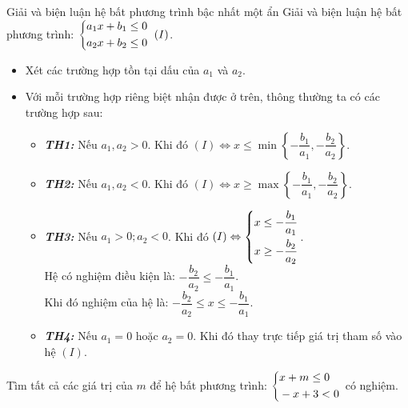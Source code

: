 \begin{dang}{Giải và biện luận hệ bất phương trình bậc nhất một ẩn}
Giải và biện luận hệ bất phương trình: $\heva{&a_1x+b_1\le 0\\&a_2x+b_2\le 0}\ (I)$. 
\begin{itemize}
\item Xét các trường hợp tồn tại dấu của $a_1$ và $a_2$.
\item Với mỗi trường hợp riêng biệt nhận được ở trên, thông thường ta có các trường hợp sau:
\begin{itemize}
\item\textbf{\textit{TH1: }}Nếu $a_1,a_2>0$. Khi đó $(I)\Leftrightarrow x\le \min\left\{-\dfrac{b_1}{a_1},-\dfrac{b_2}{a_2}\right\}$.
\item\textbf{\textit{TH2: }}Nếu $a_1,a_2<0$. Khi đó $(I)\Leftrightarrow x\ge \max\left\{-\dfrac{b_1}{a_1},-\dfrac{b_2}{a_2}\right\}$.
\item\textbf{\textit{TH3: }}Nếu $a_1>0;a_2<0$. Khi đó $(I)\Leftrightarrow \left\{\begin{aligned}&x\le -\dfrac{b_1}{a_1}\\&x\ge -\dfrac{b_2}{a_2}\end{aligned}\right.$.\\
Hệ có nghiệm điều kiện là: $-\dfrac{b_2}{a_2}\le -\dfrac{b_1}{a_1}$.\\
Khi đó nghiệm của hệ là: $-\dfrac{b_2}{a_2}\le x\le -\dfrac{b_1}{a_1}$.
\item\textbf{\textit{TH4: }}Nếu $a_1=0$ hoặc $a_2=0$. Khi đó thay trực tiếp giá trị tham số vào hệ $(I)$.
\end{itemize}
\end{itemize}
\end{dang}
\begin{vd}%
Tìm tất cả các giá trị của $m$ để hệ bất phương trình: $\left\{\begin{aligned}&x+m\le 0\\&-x+3< 0\end{aligned}\right.$ có nghiệm.
\end{vd}
